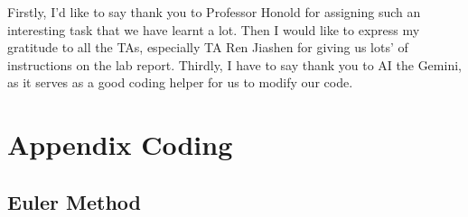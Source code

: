 \documentclass{article}
\begin{document}
Firstly, I'd like to say thank you to Professor Honold for assigning such an interesting task that we have learnt a lot. Then I would like to express my gratitude to all the TAs, especially TA Ren Jiashen for giving us lots' of instructions on the lab report. Thirdly, I have to say thank you to AI the Gemini, as it serves as a good coding helper for us to modify our code.​

\clearpage
\section{Appendix Coding}


\subsection{Euler Method}
\end{document}

